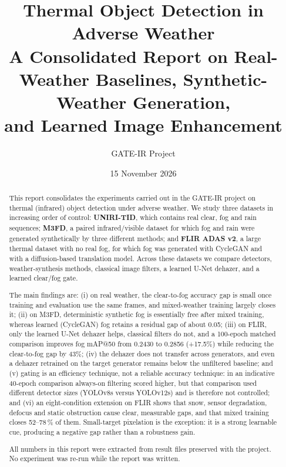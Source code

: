\documentclass[11pt,a4paper]{article}
\title{\textbf{Thermal Object Detection in Adverse Weather}\\[0.3em]
\large A Consolidated Report on Real-Weather Baselines, Synthetic-Weather Generation,\\
and Learned Image Enhancement}
\author{GATE-IR Project}
\date{15 November 2026}
\begin{document}
\maketitle

\begin{abstract}
This report consolidates the experiments carried out in the GATE-IR project on
thermal (infrared) object detection under adverse weather. We study three
datasets in increasing order of control: \textbf{UNIRI-TID}, which contains real
clear, fog and rain sequences; \textbf{M3FD}, a paired infrared/visible dataset
for which fog and rain were generated synthetically by three different methods;
and \textbf{FLIR ADAS v2}, a large thermal dataset with no real fog, for which
fog was generated with CycleGAN and with a diffusion-based translation model.
Across these datasets we compare detectors, weather-synthesis methods, classical
image filters, a learned U-Net dehazer, and a learned clear/fog gate.

The main findings are: (i) on real weather, the clear-to-fog accuracy gap is
small once training and evaluation use the same frames, and mixed-weather
training largely closes it; (ii) on M3FD, deterministic synthetic fog is essentially free after mixed
training, whereas learned (CycleGAN) fog retains a residual gap of about 0.05; (iii) on FLIR, only the learned
U-Net dehazer helps, classical filters do not, and a 100-epoch matched comparison
improves fog mAP@50 from 0.2430 to 0.2856 (+17.5\%) while reducing the
clear-to-fog gap by 43\%; (iv) the dehazer does not transfer across generators,
and even a dehazer retrained on the target generator remains below the
unfiltered baseline; and (v) gating is an efficiency technique, not a reliable
accuracy technique: in an indicative 40-epoch comparison always-on filtering
scored higher, but that comparison used different detector sizes (YOLOv8s versus
YOLOv12s) and is therefore not controlled; and (vi) an eight-condition extension
on FLIR shows that snow, sensor degradation, defocus and static obstruction
cause clear, measurable gaps, and that mixed training closes 52--78\,\% of them.
Small-target pixelation is the exception: it is a strong learnable cue, producing
a negative gap rather than a robustness gain.

All numbers in this report were extracted from result files preserved with the
project. No experiment was re-run while the report was written.
\end{abstract}

\tableofcontents
\newpage
\end{document}
